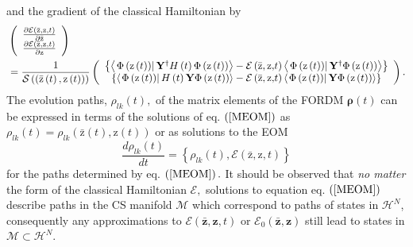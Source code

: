 \documentclass[aps,preprint]{revtex4}%
\begin{document}
and the gradient of the classical Hamiltonian by
\begin{align}
&  \left(
\begin{array}
[c]{c}%
\frac{\partial\mathcal{E}\left(  \mathrm{\bar{z},z}\mathbf{,}t\right)
}{\partial\mathrm{\bar{z}}}\\
\frac{\partial\mathcal{E}\left(  \mathrm{\bar{z},z}\mathbf{,}t\right)
}{\partial\mathrm{z}}%
\end{array}
\right) \nonumber\\
&  =\frac{1}{\mathcal{S}\left(  \left(  \mathrm{\bar{z}}\left(  t\right)
,\mathrm{z}\left(  t\right)  \right)  \right)  }\left(
\begin{array}
[c]{c}%
\left\{  \left\langle \left.  \Phi\left(  \mathrm{z}\left(  t\right)  \right)
\right\vert \mathbf{Y}^{\dagger}H\left(  t\right)  \Phi\left(  \mathrm{z}%
\left(  t\right)  \right)  \right\rangle -\mathcal{E}\left(  \mathrm{\bar
{z},z}\mathbf{,}t\right)  \left\langle \left.  \Phi\left(  \mathrm{z}\left(
t\right)  \right)  \right\vert \mathbf{Y}^{\dagger}\Phi\left(  \mathrm{z}%
\left(  t\right)  \right)  \right\rangle \right\} \\
\left\{  \left\langle \left.  \Phi\left(  \mathrm{z}\left(  t\right)  \right)
\right\vert H\left(  t\right)  \mathbf{Y}\Phi\left(  \mathrm{z}\left(
t\right)  \right)  \right\rangle -\mathcal{E}\left(  \mathrm{\bar{z}%
,z}\mathbf{,}t\right)  \left\langle \left.  \Phi\left(  \mathrm{z}\left(
t\right)  \right)  \right\vert \mathbf{Y}\Phi\left(  \mathrm{z}\left(
t\right)  \right)  \right\rangle \right\}
\end{array}
\right)  .
\end{align}
The evolution paths, $\rho_{lk}\left(  t\right)  ,$ of the matrix elements of
the FORDM $\mathbf{\rho}\left(  t\right)  $ can be expressed in terms of the
solutions of eq. $\left(  \ref{MEOM}\right)  $ as $\rho_{lk}\left(  t\right)
=\rho_{lk}\left(  \mathrm{\bar{z}}\left(  t\right)  ,\mathrm{z}\left(
t\right)  \right)  $ or as solutions to the EOM
\begin{equation}
\frac{d\rho_{lk}\left(  t\right)  }{dt}=\left\{  \rho_{lk}\left(  t\right)
,\mathcal{E}\left(  \mathrm{\bar{z}},\mathrm{z},t\right)  \right\}
\end{equation}
for the paths determined by eq. $\left(  \ref{MEOM}\right)  .$ It should be
observed that \emph{no matter} the form of the classical Hamiltonian
$\mathcal{E},$ solutions to equation eq. $\left(  \ref{MEOM}\right)  $
describe paths in the CS manifold $\mathcal{M}$ which correspond to paths of
states in $\mathcal{H}^{N}$, consequently any approximations to $\mathcal{E}%
\left(  \mathbf{\bar{z}},\mathbf{z,}t\right)  $ or $\mathcal{E}_{0}\left(
\mathbf{\bar{z}},\mathbf{z}\right)  $ still lead to states in
$\mathcal{M\subset H}^{N}.$
\end{document}
